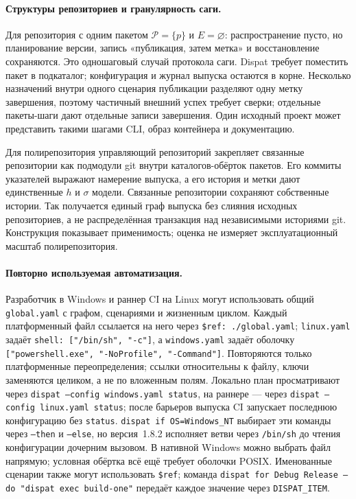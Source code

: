 \documentclass[sigconf,nonacm]{acmart}
\theoremstyle{acmplain}
\theoremstyle{acmdefinition}
\theoremstyle{acmplain}
\newcommand{\code}[1]{\texttt{#1}}
\begin{document}
\paragraph{Структуры репозиториев и гранулярность саги.}
Для репозитория с одним пакетом $\mathcal{P}=\{p\}$ и $E=\varnothing$:
распространение пусто, но планирование версии, запись «публикация, затем метка»
и восстановление сохраняются. Это одношаговый случай протокола саги. Dispat
требует поместить пакет в подкаталог; конфигурация и журнал выпуска остаются в
корне. Несколько назначений внутри одного сценария публикации разделяют одну
метку завершения, поэтому частичный внешний успех требует сверки; отдельные
пакеты-шаги дают отдельные записи завершения. Один исходный проект может
представить такими шагами CLI, образ контейнера и документацию.

Для полирепозитория управляющий репозиторий закрепляет связанные репозитории
как подмодули git внутри каталогов-обёрток пакетов. Его коммиты указателей
выражают намерение выпуска, а его история и метки дают единственные $h$ и
$\sigma$ модели. Связанные репозитории сохраняют собственные истории. Так
получается единый граф выпуска без слияния исходных репозиториев, а не
распределённая транзакция над независимыми историями git. Конструкция
показывает применимость; оценка не измеряет эксплуатационный масштаб
полирепозитория.

\paragraph{Повторно используемая автоматизация.}
Разработчик в Windows и раннер CI на Linux могут использовать общий
\code{global.yaml} с графом, сценариями и жизненным циклом. Каждый платформенный
файл ссылается на него через \code{\$ref: ./global.yaml}; \code{linux.yaml}
задаёт \code{shell: ["/bin/sh", "-c"]}, а \code{windows.yaml} задаёт оболочку
\code{["powershell.exe", "-NoProfile", "-Command"]}.
Повторяются только платформенные переопределения; ссылки относительны к файлу,
ключи заменяются целиком, а не по вложенным полям. Локально план просматривают
через \code{dispat --config windows.yaml status}, на раннере --- через
\code{dispat --config linux.yaml status}; после барьеров выпуска CI запускает
последнюю конфигурацию без \code{status}.
\code{dispat if OS=Windows\_NT} выбирает эти команды через
\code{--then} и \code{--else}, но версия~1.8.2 исполняет ветви через
\code{/bin/sh} до чтения конфигурации дочерним вызовом. В нативной Windows
можно выбрать файл напрямую; условная обёртка всё ещё требует оболочки POSIX.
Именованные сценарии также могут использовать \code{\$ref}; команда
\code{dispat for Debug Release --do "dispat exec build-one"}
передаёт каждое значение через \code{DISPAT\_ITEM}.
\end{document}
